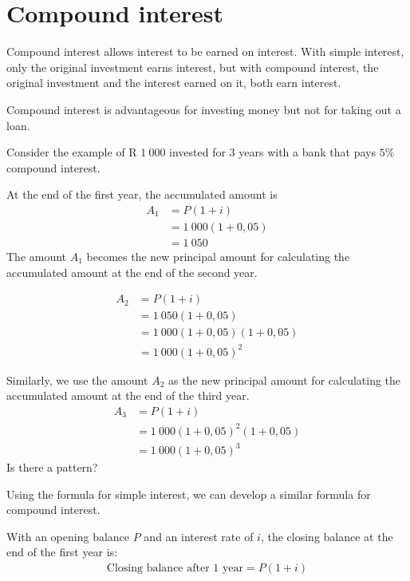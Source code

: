\section{Compound interest}

Compound interest allows interest to be earned on interest. With simple interest, only the original investment earns interest, but with compound interest, the original investment and the interest earned on it, both earn interest.\par

Compound interest is advantageous for investing money but not for taking out a loan.


Consider the example of R $1~000$ invested for 3 years with a bank that pays $5\%$ compound interest.\par 

At the end of the first year, the accumulated amount is 
\begin{align*}
    A_1 &= P(1 + i)\\
&= 1~000(1+0,05)\\
&=1~050
\end{align*}
The amount $A_1$ becomes the new principal amount for calculating the accumulated amount at the end of the second year.

\begin{align*}
    A_2 &= P(1 + i)\\
&= 1~050(1+0,05)\\
&=1~000(1+0,05)(1+0,05)\\
&= 1~000(1+0,05)^2
\end{align*}

Similarly, we use the amount $A_2$ as the new principal amount for calculating the accumulated amount at the end of the third year.
\begin{align*}
    A_3 &= P(1 + i)\\
&=1~000(1+0,05)^2(1+0,05)\\
&= 1~000(1+0,05)^3
\end{align*}
Is there a pattern?\par
Using the formula for simple interest, we can develop a similar formula for compound interest.\par

With an opening balance $P$ and an interest rate of $i$, the closing balance at the end of the first year is:
\begin{eqnarray*}
    \text{Closing balance after 1 year} = P(1 + i)
\end{eqnarray*}

